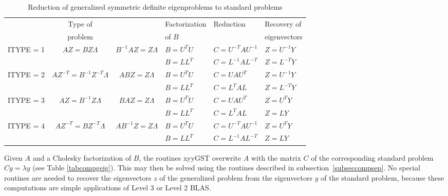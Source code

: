 \begin{table}[ht]
\caption{Reduction of generalized symmetric definite eigenproblems to standard problems}
\label{tabgstcomp}
\begin{center}
\begin{tabular}{|l|c|c|l|l|l|} \hline
& Type of    & & Factorization & Reduction & Recovery of \\
& problem   & & of $B$           &                  & eigenvectors \\
\hline
ITYPE = 1 & $AZ = BZ\Lambda$ &  $B^{-1}AZ = Z\Lambda$ &
$B = U^TU$ & $C = U^{-T} A U^{-1}$ & $Z = U^{-1} Y$ \\
 & & &
$B = LL^T$  & $C = L^{-1} A L^{-T}$   & $Z = L^{-T} Y$ \\                  
\hline
ITYPE = 2 & $AZ^{-T} = B^{-1}Z^{-T}\Lambda$ & $ABZ = Z\Lambda$ & 
$B = U^TU$ & $C = U A U^T$         & $Z = U^{-1} Y$ \\
 & & &
$B = LL^T$  & $C = L^T A L$           & $Z = L^{-T} Y$ \\
 \hline
ITYPE = 3 & $AZ = B^{-1}Z\Lambda$                  & $BAZ = Z\Lambda$ &
 $B = U^TU$ & $C = U A U^T$         & $Z = U^T Y$ \\
 & & &
 $B = LL^T$  & $C = L^T A L$           & $Z = L Y$ \\
\hline
ITYPE = 4 & $AZ^{-T} = BZ^{-T}\Lambda$ &  $AB^{-1}Z = Z\Lambda$ &
$B = U^TU$ & $C = U^{-T} A U^{-1}$ & $Z = U^T Y$ \\
  & & &
$B = LL^T$  & $C = L^{-1} A L^{-T}$   & $Z = L Y$ \\                  
\hline
\end{tabular}
\end{center}
\end{table}

Given $A$ and a Cholesky factorization of $B$,
the routines xyyGST overwrite $A$
with the matrix $C$ of the corresponding standard problem
$ Cy = \lambda y$ (see Table \ref{tabcompgeig}).
This may then be solved using the routines described in
subsection~\ref{subseccompsep}.
No special routines are needed
to recover the eigenvectors $z$ of the generalized problem from
the eigenvectors $y$ of the standard problem, because these
computations are simple applications of Level 3 or Level 2 BLAS.


